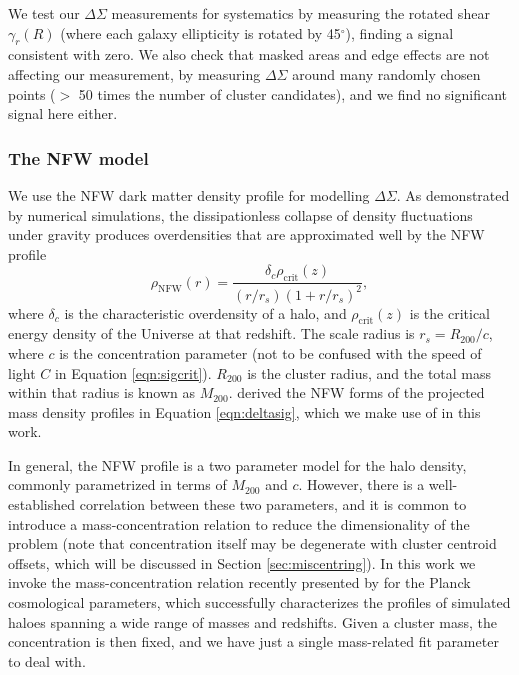 We test our $\Delta\Sigma$ measurements for systematics by measuring the rotated shear $\gamma_r(R)$ (where each galaxy ellipticity is rotated by 45$^{\circ}$), finding a signal consistent with zero. We also check that masked areas and edge effects are not affecting our measurement, by measuring $\Delta\Sigma$ around many randomly chosen points ($>$ 50 times the number of cluster candidates), and we find no significant signal here either.

\subsubsection{The \ac{NFW} model}
\label{sec:nfw}

We use the \acf{NFW} dark matter density profile \citep{nfw97} for modelling $\Delta\Sigma$. As demonstrated by numerical simulations, the dissipationless collapse of density fluctuations under gravity produces overdensities that are approximated well by the \ac{NFW} profile
\begin{equation}
\rho_{\mathrm{NFW}}(r) = \frac{\delta_c \rho_{\mathrm{crit}}(z)}{(r/r_s)(1+r/r_s)^2},
\end{equation}
where $\delta_c$ is the characteristic overdensity of a halo, and $\rho_{\mathrm{crit}}(z)$ is the critical energy density of the Universe at that redshift. The scale radius is $r_s = R_{200}/c$, where $c$ is the concentration parameter (not to be confused with the speed of light $C$ in Equation \ref{eqn:sigcrit}). $R_{200}$ is the cluster radius, and the total mass within that radius is known as $M_{200}$. \citet{Wright00} derived the \ac{NFW} forms of the projected mass density profiles in Equation \ref{eqn:deltasig}, which we make use of in this work.

In general, the \ac{NFW} profile is a two parameter model for the halo density, commonly parametrized in terms of $M_{200}$ and $c$. However, there is a well-established correlation between these two parameters, and it is common to introduce a mass-concentration relation to reduce the dimensionality of the problem (note that concentration itself may be degenerate with cluster centroid offsets, which will be discussed in Section \ref{sec:miscentring}). In this work we invoke the mass-concentration relation recently presented by \citet{Dutton14} for the Planck cosmological parameters, which successfully characterizes the profiles of simulated haloes spanning a wide range of masses and redshifts. Given a cluster mass, the concentration is then fixed, and we have just a single mass-related fit parameter to deal with.



